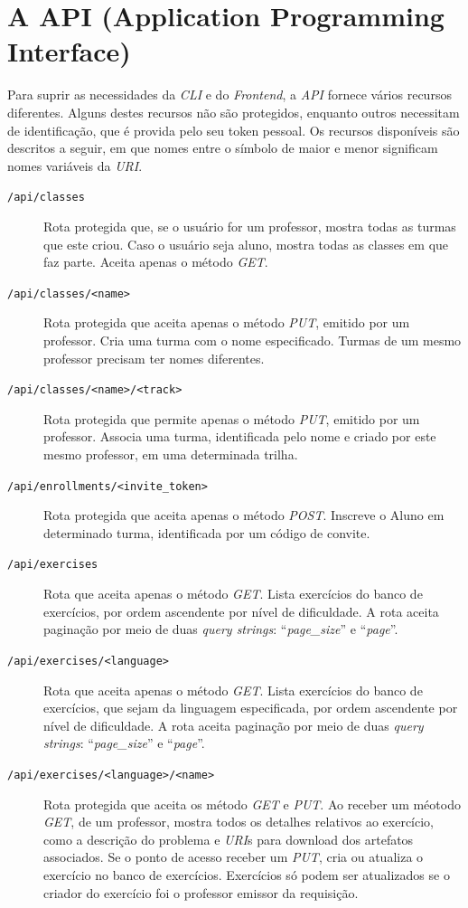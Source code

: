 \section{A API (Application Programming Interface)}
Para suprir as necessidades da \emph{CLI} e do 
\emph{Frontend}, a \emph{API} fornece vários recursos diferentes. Alguns destes recursos não são protegidos, enquanto outros necessitam de identificação, que é provida pelo seu token pessoal. Os recursos disponíveis são
descritos a seguir, em que nomes entre o símbolo de maior e menor significam nomes variáveis 
da \emph{URI}.
\begin{description}
\item[\texttt{/api/classes}]  Rota protegida que, se o usuário for um professor, mostra todas as turmas que este criou. Caso o usuário seja aluno, mostra todas as classes em que faz parte. 
Aceita apenas o método \emph{GET}.
\item[\texttt{/api/classes/<name>}] Rota protegida que aceita apenas o método \emph{PUT}, emitido por 
um professor. Cria uma turma com o nome especificado. Turmas de um mesmo professor precisam 
ter nomes diferentes.
\item[\texttt{/api/classes/<name>/<track>}] Rota protegida que permite apenas o método \emph{PUT}, emitido por 
um professor. Associa uma turma, identificada pelo nome e criado por este mesmo professor, em uma determinada trilha.
\item[\texttt{/api/enrollments/<invite\_token>}] Rota protegida que aceita apenas o método \emph{POST}. Inscreve o Aluno em determinado turma, identificada por um código de convite.
\item[\texttt{/api/exercises}] Rota que aceita apenas o método \emph{GET}. Lista exercícios do banco 
de exercícios, por ordem ascendente por nível de dificuldade. A rota aceita paginação por meio 
de duas \emph{query strings}: ``\emph{page\_size}'' e ``\emph{page}''.
\item[\texttt{/api/exercises/<language>}] Rota que aceita apenas o método \emph{GET}. Lista exercícios do banco 
de exercícios, que sejam da linguagem especificada, por ordem ascendente por nível de dificuldade. A rota aceita paginação por meio 
de duas \emph{query strings}: ``\emph{page\_size}'' e ``\emph{page}''.
\item[\texttt{/api/exercises/<language>/<name>}] Rota protegida que aceita os método \emph{GET} e
\emph{PUT}. Ao receber um méotodo \emph{GET}, de um professor, mostra todos os detalhes relativos ao exercício, como a descrição do problema e \emph{URI}s para download dos artefatos associados. Se o ponto de acesso receber um \emph{PUT}, cria ou atualiza o exercício no banco de exercícios. Exercícios só podem ser atualizados se o criador do exercício foi o professor emissor da requisição.

\end{description}
